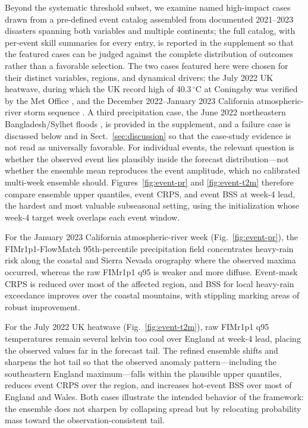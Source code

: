 \documentclass[11pt]{article}
\newcommand{\modelshort}{FIMr1p1}
\newcommand{\methodname}{\modelshort{}-FlowMatch}
\begin{document}
Beyond the systematic threshold subset, we examine named high-impact cases drawn from a pre-defined event catalog assembled from documented 2021--2023 disasters spanning both variables and multiple continents; the full catalog, with per-event skill summaries for every entry, is reported in the supplement so that the featured cases can be judged against the complete distribution of outcomes rather than a favorable selection. The two cases featured here were chosen for their distinct variables, regions, and dynamical drivers: the July 2022 UK heatwave, during which the UK record high of 40.3\,$^\circ$C at Coningsby was verified by the Met Office \citep{MetOffice2022Heatwave}, and the December 2022--January 2023 California atmospheric-river storm sequence \citep{CW3E2023CaliforniaAR}. A third precipitation case, the June 2022 northeastern Bangladesh/Sylhet floods \citep{Reuters2022BangladeshFloods}, is provided in the supplement, and a failure case is discussed below and in Sect.~\ref{sec:discussion} so that the case-study evidence is not read as universally favorable. For individual events, the relevant question is whether the observed event lies plausibly inside the forecast distribution---not whether the ensemble mean reproduces the event amplitude, which no calibrated multi-week ensemble should. Figures~\ref{fig:event-pr} and \ref{fig:event-t2m} therefore compare ensemble upper quantiles, event CRPS, and event BSS at week-4 lead, the hardest and most valuable subseasonal setting, using the initialization whose week-4 target week overlaps each event window.

For the January 2023 California atmospheric-river week (Fig.~\ref{fig:event-pr}), the \methodname{} 95th-percentile precipitation field concentrates heavy-rain risk along the coastal and Sierra Nevada orography where the observed maxima occurred, whereas the raw \modelshort{} q95 is weaker and more diffuse. Event-mask CRPS is reduced over most of the affected region, and BSS for local heavy-rain exceedance improves over the coastal mountains, with stippling marking areas of robust improvement.

For the July 2022 UK heatwave (Fig.~\ref{fig:event-t2m}), raw \modelshort{} q95 temperatures remain several kelvin too cool over England at week-4 lead, placing the observed values far in the forecast tail. The refined ensemble shifts and sharpens the hot tail so that the observed anomaly pattern---including the southeastern England maximum---falls within the plausible upper quantiles, reduces event CRPS over the region, and increases hot-event BSS over most of England and Wales. Both cases illustrate the intended behavior of the framework: the ensemble does not sharpen by collapsing spread but by relocating probability mass toward the observation-consistent tail.
\end{document}
